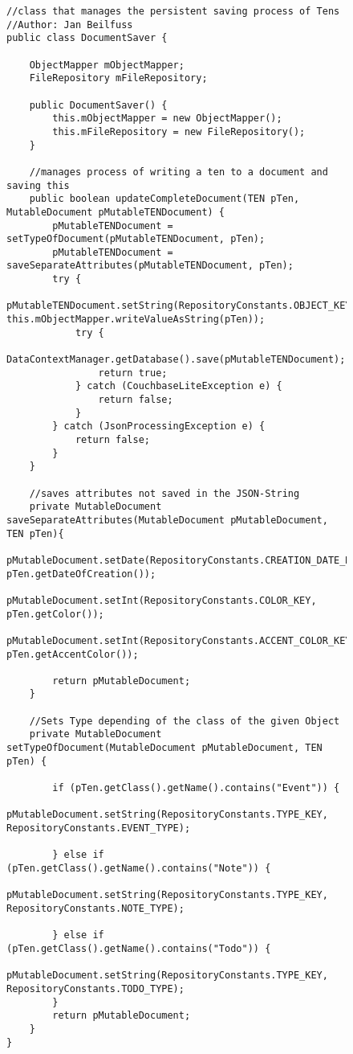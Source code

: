\begin{figure}[H]
\begin{lstlisting}[caption=DocumentSaver (Jan Beilfuß)]
//class that manages the persistent saving process of Tens
//Author: Jan Beilfuss
public class DocumentSaver {

    ObjectMapper mObjectMapper;
    FileRepository mFileRepository;

    public DocumentSaver() {
        this.mObjectMapper = new ObjectMapper();
        this.mFileRepository = new FileRepository();
    }

    //manages process of writing a ten to a document and saving this
    public boolean updateCompleteDocument(TEN pTen, MutableDocument pMutableTENDocument) {
        pMutableTENDocument = setTypeOfDocument(pMutableTENDocument, pTen);
        pMutableTENDocument = saveSeparateAttributes(pMutableTENDocument, pTen);
        try {
            pMutableTENDocument.setString(RepositoryConstants.OBJECT_KEY, this.mObjectMapper.writeValueAsString(pTen));
            try {
                DataContextManager.getDatabase().save(pMutableTENDocument);
                return true;
            } catch (CouchbaseLiteException e) {
                return false;
            }
        } catch (JsonProcessingException e) {
            return false;
        }
    }

    //saves attributes not saved in the JSON-String
    private MutableDocument saveSeparateAttributes(MutableDocument pMutableDocument, TEN pTen){
        pMutableDocument.setDate(RepositoryConstants.CREATION_DATE_KEY, pTen.getDateOfCreation());
        pMutableDocument.setInt(RepositoryConstants.COLOR_KEY, pTen.getColor());
        pMutableDocument.setInt(RepositoryConstants.ACCENT_COLOR_KEY, pTen.getAccentColor());

        return pMutableDocument;
    }

    //Sets Type depending of the class of the given Object
    private MutableDocument setTypeOfDocument(MutableDocument pMutableDocument, TEN pTen) {

        if (pTen.getClass().getName().contains("Event")) {
            pMutableDocument.setString(RepositoryConstants.TYPE_KEY, RepositoryConstants.EVENT_TYPE);

        } else if (pTen.getClass().getName().contains("Note")) {
            pMutableDocument.setString(RepositoryConstants.TYPE_KEY, RepositoryConstants.NOTE_TYPE);

        } else if (pTen.getClass().getName().contains("Todo")) {
            pMutableDocument.setString(RepositoryConstants.TYPE_KEY, RepositoryConstants.TODO_TYPE);
        }
        return pMutableDocument;
    }
}

\end{lstlisting}
\end{figure}

